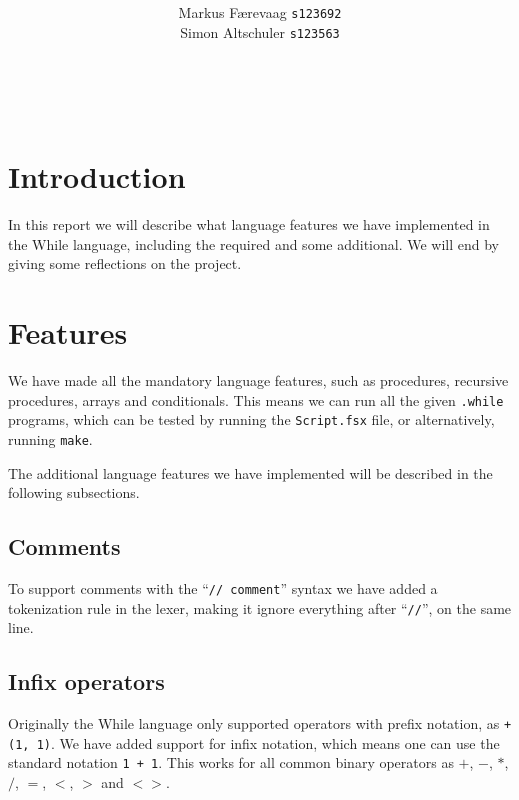 \documentclass{article}
\title{\TITLE\\ {\large \COURSE}}
\date{\DATE}
\author{
  Markus Færevaag {\tt s123692}\\
  Simon Altschuler {\tt s123563}
}
\begin{document}
\maketitle
\vspace{10cm}
 \\
\clearpage


\section{Introduction}
In this report we will describe what language features we have
implemented in the While language, including the required and some
additional. We will end by giving some reflections on the
project.


\section{Features}
We have made all the mandatory language features, such as procedures,
recursive procedures, arrays and conditionals. This means we can run
all the given {\tt .while} programs, which can be tested by running
the {\tt Script.fsx} file, or alternatively, running {\tt make}.

The additional language features we have implemented will be described
in the following subsections.

\subsection{Comments}
To support comments with the ``{\tt // comment}'' syntax we have added a
tokenization rule in the lexer, making it ignore everything after
``{\tt //}'', on the same line.

\subsection{Infix operators}
Originally the While language only supported operators with prefix
notation, as {\tt +(1, 1)}. We have added support for infix notation,
which means one can use the standard notation {\tt 1 + 1}. This works
for all common binary operators as $+$, $-$, $*$, $/$, $=$, $<$,
$>$ and $< >$.

\end{document}
